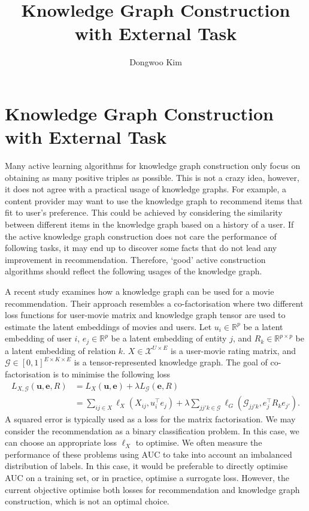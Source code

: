 \documentclass{article} %
\title{Knowledge Graph Construction with External Task }
\author{
Dongwoo Kim
}
\theoremstyle{definition}
\begin{document}
\maketitle


\section{Knowledge Graph Construction with External Task}

Many active learning algorithms for knowledge graph construction only focus on obtaining as many positive triples as possible. This is not a crazy idea, however, it does not agree with a practical usage of knowledge graphs. For example, a content provider may want to use the knowledge graph to recommend items that fit to user's preference. This could be achieved by considering the similarity between different items in the knowledge graph based on a history of a user. If the active knowledge graph construction does not care the performance of following tasks, it may end up to discover some facts that do not lead any improvement in recommendation. Therefore, `good' active construction algorithms should reflect the following usages of the knowledge graph.

A recent study \cite{Zhang2016} examines how a knowledge graph can be used for a movie recommendation. Their approach resembles a co-factorisation where two different loss functions for user-movie matrix and knowledge graph tensor are used to estimate the latent embeddings of movies and users.
Let $u_i \in \mathbb{R}^p$ be a latent embedding of user $i$, $e_j \in \mathbb{R}^p$ be a latent embedding of entity $j$, and $R_k \in \mathbb{R}^{p\times p}$ be a latent embedding of relation $k$. $X \in \mathcal{X}^{U \times E}$ is a user-movie rating matrix, and $\mathcal{G} \in [0,1]^{E\times K\times E}$ is a tensor-represented knowledge graph. The goal of co-factorisation is to minimise the following loss
\begin{align}
L_{X, \mathcal{G}}(\mathbf{u}, \mathbf{e}, R) & = L_X(\mathbf{u}, \mathbf{e}) + \lambda L_\mathcal{G}(\mathbf{e}, R)\\
& = \sum_{ij \in X}\ell_X(X_{ij}, u_{i}^\top e_{j}) + \lambda \sum_{jj'k \in \mathcal{G}}\ell_G(\mathcal{G}_{jj'k}, e_j^\top R_k e_{j'}). \label{eqn:two_losses}
\end{align}
A squared error is typically used as a loss for the matrix factorisation. We may consider the recommendation as a binary classification problem. In this case, we can choose an appropriate loss $\ell_X$ to optimise.  We often measure the performance of these problems using AUC to take into account an imbalanced distribution of labels. In this case, it would be preferable to directly optimise AUC on a training set, or in practice, optimise a surrogate loss. However, the current objective optimise both losses for recommendation and knowledge graph construction, which is not an optimal choice.
\end{document}
